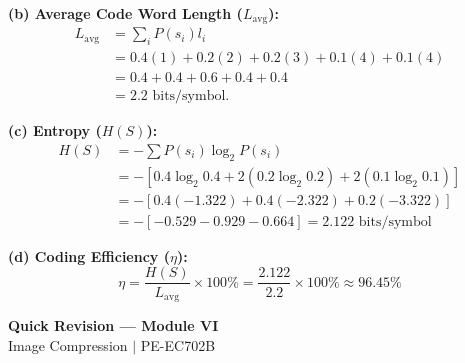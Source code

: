 \documentclass[12pt,a4paper]{article}
\begin{document}
\begin{tcolorbox}[examplebox, title={Huffman Coding Design}]
\textbf{(b) Average Code Word Length ($L_{\text{avg}}$):}
\begin{align*}
  L_{\text{avg}} &= \sum_i P(s_i) l_i \\
                &= 0.4(1) + 0.2(2) + 0.2(3) + 0.1(4) + 0.1(4) \\
                &= 0.4 + 0.4 + 0.6 + 0.4 + 0.4 \\
                &= 2.2 \text{ bits/symbol}.
\end{align*}

\textbf{(c) Entropy ($H(S)$):}
\begin{align*}
  H(S) &= - \sum P(s_i) \log_2 P(s_i) \\
  &= - [0.4\log_2 0.4 + 2(0.2\log_2 0.2) + 2(0.1\log_2 0.1)] \\
  &= - [0.4(-1.322) + 0.4(-2.322) + 0.2(-3.322)] \\
  &= - [-0.529 - 0.929 - 0.664] = 2.122 \text{ bits/symbol}
\end{align*}

\textbf{(d) Coding Efficiency ($\eta$):}
\begin{equation*}
  \eta = \frac{H(S)}{L_{\text{avg}}} \times 100\% = \frac{2.122}{2.2} \times 100\% \approx 96.45\%
\end{equation*}
\end{tcolorbox}

\newpage

\begin{center}
  {\large\bfseries\color{myred} Quick Revision --- Module VI}\\[3pt]
  {\small\color{mydark} Image Compression $|$ PE-EC702B}
\end{center}
\noindent{\color{myred}\rule{\linewidth}{1.2pt}}
\vspace{4pt}
\end{document}
